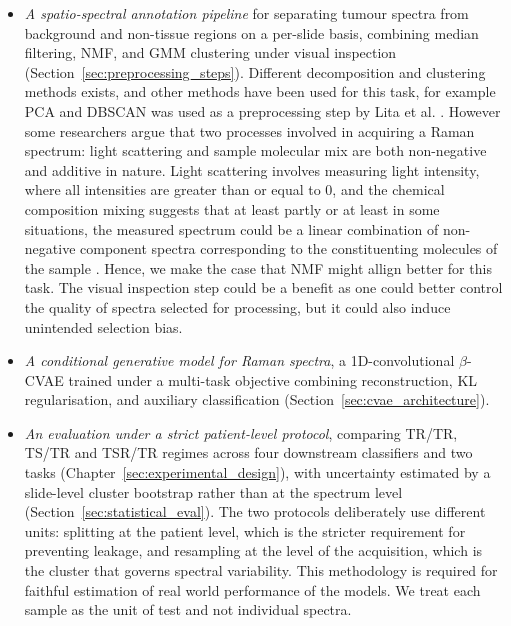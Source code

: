 \begin{itemize}
  \item \emph{A spatio-spectral annotation pipeline} for separating tumour spectra from
        background and non-tissue regions on a per-slide basis, combining median filtering,
        NMF, and GMM clustering under visual inspection
        (Section~\ref{sec:preprocessing_steps}). Different decomposition and clustering methods exists, and other methods have been used for this task, for example PCA and DBSCAN was used as a preprocessing step by Lita et al. \cite{apollonov2024raman}. However some researchers argue that two processes involved in acquiring a Raman spectrum: light scattering and sample molecular mix are both non-negative and additive in nature. Light scattering involves measuring light intensity, where all intensities are greater than or equal to 0, and the chemical composition mixing suggests that at least partly or at least in some situations, the measured spectrum could be a linear combination of non-negative component spectra corresponding to the constituenting molecules of the sample \cite{Alix2022, Jafari2025}. Hence, we make the case that NMF might allign better for this task. The visual inspection step could be a benefit as one could better control the quality of spectra selected for processing, but it could also induce unintended selection bias.

  \item \emph{A conditional generative model for Raman spectra}, a 1D-convolutional
        $\beta$-CVAE trained under a multi-task objective combining reconstruction, KL
        regularisation, and auxiliary classification (Section~\ref{sec:cvae_architecture}).

  \item \emph{An evaluation under a strict patient-level protocol}, comparing TR/TR, TS/TR
        and TSR/TR regimes across four downstream classifiers and two tasks
        (Chapter~\ref{sec:experimental_design}), with uncertainty estimated by a slide-level
        cluster bootstrap rather than at the spectrum level
        (Section~\ref{sec:statistical_eval}). The two protocols deliberately use
        different units: splitting at the patient level, which is the stricter
        requirement for preventing leakage, and resampling at the level of the
        acquisition, which is the cluster that governs spectral variability. This methodology is required for faithful estimation of real world performance of the models. We treat each sample as the unit of test and not individual spectra.


\end{itemize}
